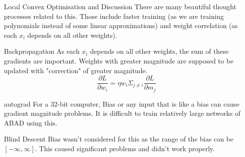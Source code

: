 \documentclass{article}
\begin{document}
	\begin{section}{Local Convex Optimisation and Discussion}
		There are many beautiful thought processes related to this. Those include faster training (as we are training polynomials instead of some linear approximations) and weight correlation (as each $x_i$ depends on all other weights).
		
		\begin{subsection}{Backpropagation}
			As each $x_i$ depends on all other weights, the sum of these gradients are important. Weights with greater magnitude are supposed to be updated with "correction" of greater magnitude.
			\begin{equation}
				\frac{\partial L}{\partial w_i} = \eta w_i \Sigma_{j \ne i} \frac{\partial L}{\partial m_j}
			\end{equation}
		\end{subsection}

		\begin{subsection}{autograd}
			For a 32-bit computer, Bias or any input that is like a bias can cause gradient magnitude problems. It is difficult to train relatively large networks of ABAD using this.
		\end{subsection}

		\begin{subsection}{Blind Descent}
			Bias wasn't considered for this as the range of the bias can be $[-\infty, \infty]$. This caused significant problems and didn't work properly.
		\end{subsection}

	\end{section}
	
\end{document}
